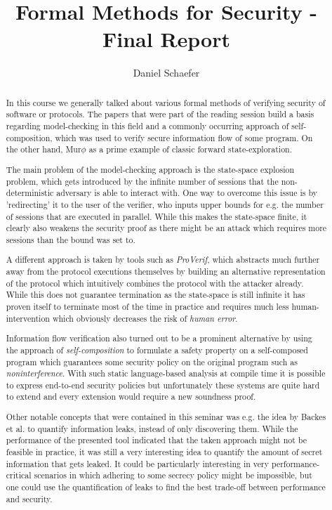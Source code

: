 \documentclass[a4paper,UKenglish]{lipics-v2018}
\title{Formal Methods for Security - Final Report}
\author{Daniel Schaefer}{2549458}{}{}{}
\def\murphi{Mur$\phi$ }
\begin{document}
\maketitle

\begin{abstract}

In this course we generally talked about various formal methods of verifying security of software or protocols. The papers that were part of the reading session build a basis regarding model-checking in this field and a commonly occurring approach of self-composition, which was used to verify secure information flow of some program. On the other hand, \murphi as a prime example of classic forward state-exploration.

The main problem of the model-checking approach is the state-space explosion problem, which gets introduced by the infinite number of sessions that the non-deterministic adversary is able to interact with. One way to overcome this issue is by 'redirecting' it to the user of the verifier, who inputs upper bounds for e.g. the number of sessions that are executed in parallel. While this makes the state-space finite, it clearly also weakens the security proof as there might be an attack which requires more sessions than the bound was set to.

A different approach is taken by tools such as \textit{ProVerif}, which abstracts much further away from the protocol executions themselves by building an alternative representation of the protocol which intuitively combines the protocol with the attacker already. While this does not guarantee termination as the state-space is still infinite it has proven itself to terminate most of the time in practice and requires much less human-intervention which obviously decreases the risk of \textit{human error}.

Information flow verification also turned out to be a prominent alternative by using the approach of \textit{self-composition} to formulate a safety property on a self-composed program which guarantees some security policy on the original program such as \textit{noninterference}. With such static language-based analysis at compile time it is possible to express end-to-end security policies but unfortunately these systems are quite hard to extend and every extension would require a new soundness proof.

Other notable concepts that were contained in this seminar was e.g. the idea by Backes et al. to quantify information leaks, instead of only discovering them. While the performance of the presented tool indicated that the taken approach might not be feasible in practice, it was still a very interesting idea to quantify the amount of secret information that gets leaked. It could be particularly interesting in very performance-critical scenarios in which adhering to some secrecy policy might be impossible, but one could use the quantification of leaks to find the best trade-off between performance and security.


\end{abstract}
\end{document}
